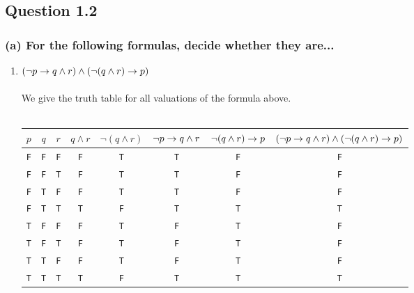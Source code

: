 \newpage
\subsection*{Question 1.2}
\subsubsection*{(a) \mdseries For the following formulas, decide whether they are...}
\begin{enumerate}[i]
	\item
	{
	$(\neg p \to q \land r) \land (\neg (q \land r) \to p)$ \\\\
	We give the truth table for all valuations of the formula above. \\\\
	\begin{tabular}{ccccccc|c}
		$p$ & $q$ & $r$ &
		$q \land r$ &
		$\neg (q \land r)$ &
		$\neg p \to q \land r$ &
		$\neg (q \land r) \to p$ &
		$(\neg p \to q \land r) \land (\neg (q \land r) \to p)$ \\ \hline
		{\tt F} & {\tt F} & {\tt F} & {\tt F} & {\tt T} & {\tt T} & {\tt F} & {\tt F} \\
		{\tt F} & {\tt F} & {\tt T} & {\tt F} & {\tt T} & {\tt T} & {\tt F} & {\tt F} \\
		{\tt F} & {\tt T} & {\tt F} & {\tt F} & {\tt T} & {\tt T} & {\tt F} & {\tt F} \\
		{\tt F} & {\tt T} & {\tt T} & {\tt T} & {\tt F} & {\tt T} & {\tt T} & {\tt T} \\
		{\tt T} & {\tt F} & {\tt F} & {\tt F} & {\tt T} & {\tt F} & {\tt T} & {\tt F} \\
		{\tt T} & {\tt F} & {\tt T} & {\tt F} & {\tt T} & {\tt F} & {\tt T} & {\tt F} \\
		{\tt T} & {\tt T} & {\tt F} & {\tt F} & {\tt T} & {\tt F} & {\tt T} & {\tt F} \\
		{\tt T} & {\tt T} & {\tt T} & {\tt T} & {\tt F} & {\tt T} & {\tt T} & {\tt T} \\
	\end{tabular}
	
	}
	

\end{enumerate}
